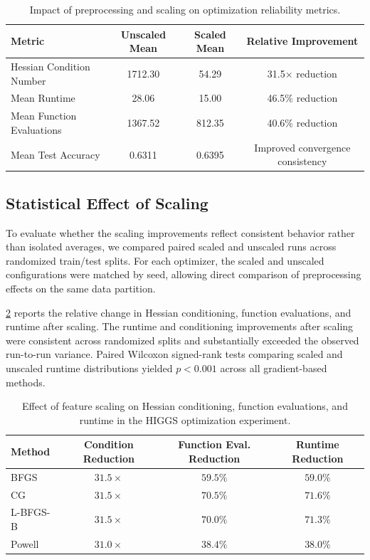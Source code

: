 \begin{table}
\centering
\begin{tabular}{lccc}
\hline
\textbf{Metric} &
\textbf{Unscaled Mean} &
\textbf{Scaled Mean} &
\textbf{Relative Improvement} \\
\hline
Hessian Condition Number & 1712.30 & 54.29 & 31.5$\times$ reduction \\
Mean Runtime & 28.06 & 15.00 & 46.5\% reduction \\
Mean Function Evaluations & 1367.52 & 812.35 & 40.6\% reduction \\
Mean Test Accuracy & 0.6311 & 0.6395 & Improved convergence consistency \\
\hline
\end{tabular}

\caption{Impact of preprocessing and scaling on optimization reliability metrics.}
\label{tab:scaling_impact}
\end{table}

\subsection{Statistical Effect of Scaling}

To evaluate whether the scaling improvements reflect consistent behavior rather than isolated averages, we compared paired scaled and unscaled runs across randomized train/test splits. For each optimizer, the scaled and unscaled configurations were matched by seed, allowing direct comparison of preprocessing effects on the same data partition.

\cref{tab:scaling_significance} reports the relative change in Hessian conditioning, function evaluations, and runtime after scaling. The runtime and conditioning improvements after scaling were consistent across randomized splits and substantially exceeded the observed run-to-run variance. Paired Wilcoxon signed-rank tests comparing scaled and unscaled runtime distributions yielded $p < 0.001$ across all gradient-based methods.

\begin{table}
\centering
\small
\begin{tabular}{lccc}
\hline
\textbf{Method} &
\textbf{Condition Reduction} &
\textbf{Function Eval. Reduction} &
\textbf{Runtime Reduction} \\
\hline
BFGS & $31.5\times$ & $59.5\%$ & $59.0\%$ \\
CG & $31.5\times$ & $70.5\%$ & $71.6\%$ \\
L-BFGS-B & $31.5\times$ & $70.0\%$ & $71.3\%$ \\
Powell & $31.0\times$ & $38.4\%$ & $38.0\%$ \\
\hline
\end{tabular}
\caption{Effect of feature scaling on Hessian conditioning, function evaluations, and runtime in the HIGGS optimization experiment.}
\label{tab:scaling_significance}
\end{table}


